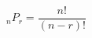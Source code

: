 \documentclass[preview]{standalone}
\begin{document}
\begin{center}
\[{}_nP_r = \frac{n!}{(n-r)!}\]
\end{center}
\end{document}
